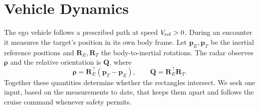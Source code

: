 \documentclass[journal]{IEEEtran}
\theoremstyle{definition}
\newcommand{\vct}[1]{\boldsymbol{#1}}
\newcommand{\mtx}[1]{\mathbf{#1}}
\begin{document}
\section{Vehicle Dynamics}\label{sec:systemDesign}
The ego vehicle follows a prescribed path at speed $V_{\rm ref}>0$.
During an encounter it measures the target's position in its own body
frame. Let $\vct p_E,\vct p_T$ be the inertial reference positions
and $\mtx R_E,\mtx R_T$ the body-to-inertial rotations. The radar
observes $\vct\rho$ and the relative orientation is $\mtx Q$, where
\begin{equation}\label{eq:relativepose}
 \vct\rho=\mtx R_E^\top(\vct p_T-\vct p_E),\qquad
 \mtx Q=\mtx R_E^\top\mtx R_T .
\end{equation}
Together these quantities determine whether the rectangles intersect.
We seek one input, based on the measurements to date, that keeps them
apart and follows the cruise command whenever safety permits.
\end{document}

